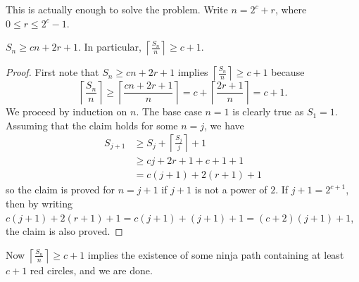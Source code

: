 This is actually enough to solve the problem.
Write $n = 2^c + r$, where $0 \leq r \leq 2^c - 1$.
\begin{claim*}
$S_n \geq cn + 2r + 1$. In particular, $\left\lceil \frac{S_n}{n} \right\rceil \geq c + 1$.
\end{claim*}

\begin{proof}
First note that $S_n \geq cn + 2r + 1$ implies
$\left\lceil \frac{S_n}{n} \right\rceil \geq c + 1$ because
\[ \left\lceil \frac{S_n}{n} \right\rceil \geq \left\lceil \frac{cn + 2r + 1}{n} \right\rceil
= c + \left\lceil \frac{2r + 1}{n} \right\rceil = c + 1.
\]
We proceed by induction on $n$.
The base case $n = 1$ is clearly true as $S_1 = 1$.
Assuming that the claim holds for some $n=j$, we have
\begin{align*}
    S_{j+1} &\geq S_j + \left\lceil \frac{S_j}{j} \right\rceil + 1 \\
    &\geq cj + 2r + 1 + c + 1 + 1 \\
    &= c(j+1) + 2(r+1) + 1
\end{align*}
so the claim is proved for $n=j+1$ if $j+1$ is not a power of $2$.
If $j+1 = 2^{c+1}$, then by writing
$c(j+1) + 2(r+1) + 1 = c(j+1) + (j+1) + 1 = (c+2)(j+1) + 1$, the claim is also proved.
\end{proof}

Now $\left\lceil \frac{S_n}{n} \right\rceil \geq c + 1$ implies the existence of
some ninja path containing at least $c+1$ red circles, and we are done.

